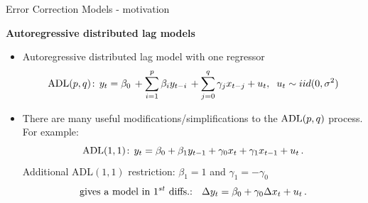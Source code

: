 \documentclass{beamer}
\begin{document}
\begin{frame}{Error Correction Models - motivation}

\textbf{Autoregressive distributed lag models}\\
\medskip
\begin{itemize}
\item Autoregressive distributed lag model with one regressor
$$\textnormal{ADL}(p,q)\!: \, y_t = \beta_0 \, + \sum_{i=1}^p \beta_i y_{t-i} \, + 
         \sum_{j=0}^q \gamma_j x_{t-j} + u_t, \hspace{0.2cm}
         u_t \sim iid(0,\sigma^2)$$

\item There are many useful modifications/simplifications to the $\textnormal{ADL}(p,q)$ process. For example:
\begin{equation} \label{ADL11}
\textnormal{ADL}(1,1)\!: \, y_t = \beta_0 + \beta_1 y_{t-1} + 
         \gamma_0 x_t + \gamma_1 x_{t-1} + u_t \,.
\end{equation}
Additional ADL$(1,1)$ restriction: $\beta_1 = 1$ and $\gamma_1 = -\gamma_0$
$$\textnormal{gives a model in $1^{st}$ diffs.: } \,\,\, \Delta y_t = \beta_0 + \gamma_0 \Delta x_t + u_t\,. $$
\end{itemize}

\end{frame}
\end{document}
